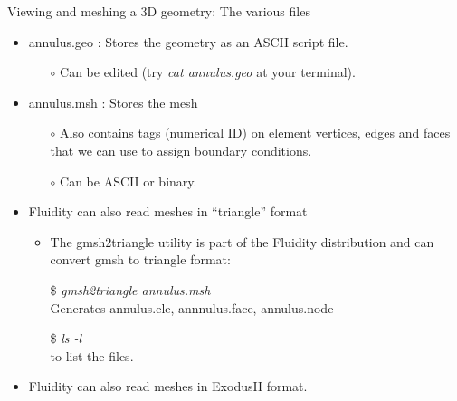 \documentclass[t]{beamer}
\begin{document}
\begin{frame}{Viewing and meshing a 3D geometry: The various files}
   \begin{itemize}
      \item annulus.geo : Stores the geometry as an ASCII script file.
      \begin{itemize}
         \item[$\circ$] Can be edited (try \emph{cat annulus.geo} at your terminal).
      \end{itemize}
      \item annulus.msh : Stores the mesh
      \begin{itemize}
         \item[$\circ$] Also contains tags (numerical ID) on element vertices, edges and faces that we can use to assign boundary conditions.
         \item[$\circ$] Can be ASCII or binary.
      \end{itemize}\vspace{20pt}
      \item Fluidity can also read meshes in ``triangle'' format
      \begin{itemize}
         \item The gmsh2triangle utility is part of the Fluidity distribution and can convert gmsh to triangle format:
         \item[\$] \emph{gmsh2triangle annulus.msh} \\ \hspace{10pt} Generates annulus.ele, annnulus.face, annulus.node
         \item[\$] \emph{ls -l} \\ \hspace{10pt} to list the files.
      \end{itemize}
      \item Fluidity can also read meshes in ExodusII format.
   \end{itemize}
\end{frame}
\end{document}
